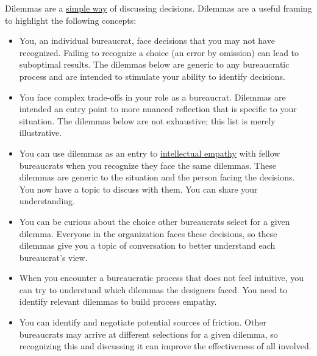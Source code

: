Dilemmas are a \href{https://en.wikipedia.org/wiki/Defeasible_reasoning}{simple way}
of discussing decisions. %
Dilemmas are a useful framing to highlight the following concepts:
\begin{itemize}
    \item You, an individual bureaucrat, face decisions that you may not have recognized. Failing to recognize a choice (an error by omission) can lead to suboptimal results. The dilemmas below are generic to any bureaucratic process and are intended to stimulate your ability to identify decisions. 
    \item You face complex trade-offs in your role as a bureaucrat. Dilemmas are intended an entry point to more nuanced reflection that is specific to your situation. The dilemmas below are not exhaustive; this list is merely illustrative. 
    \item You can use dilemmas as an entry to \href{https://en.wikipedia.org/wiki/Theory_of_mind}{intellectual empathy} 
    with fellow bureaucrats when you recognize they face the same dilemmas. These dilemmas are generic to the situation and the person facing the decisions. You now have a topic to discuss with them. You can share your understanding. 
    \item You can be curious about the choice other bureaucrats select for a given dilemma. Everyone in the organization faces these decisions, so these dilemmas give you a topic of conversation to better understand each bureaucrat's view.
    \item When you encounter a bureaucratic process that does not feel intuitive, 
    you can try to understand which dilemmas the designers faced. 
    You need to identify relevant dilemmas to build \gls{process empathy}.
    \item You can identify and negotiate potential sources of friction. Other bureaucrats may arrive at different selections for a given dilemma, so recognizing this and discussing it can improve the effectiveness of all involved.
\end{itemize}


